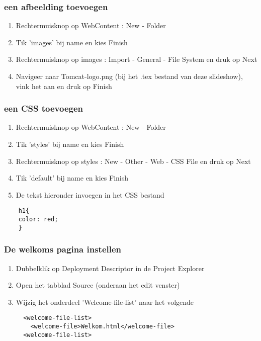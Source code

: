\documentclass{beamer}
\begin{document}
\begin{frame}

\frametitle{een afbeelding toevoegen}

\begin{enumerate}
  \item Rechtermuisknop op WebContent : New - Folder
  \item Tik 'images' bij name en kies Finish
  \item Rechtermuisknop op images : Import - General - File System en druk op Next
  \item Navigeer naar Tomcat-logo.png (bij het .tex bestand van deze slideshow), vink het aan en druk op Finish
\end{enumerate}

\end{frame}


\begin{frame}[fragile]

\frametitle{een CSS toevoegen}

\begin{enumerate}
  \item Rechtermuisknop op WebContent : New - Folder
  \item Tik 'styles' bij name en kies Finish
  \item Rechtermuisknop op styles : New - Other - Web - CSS File en druk op Next
  \item Tik 'default' bij name en kies Finish
  \item De tekst hieronder invoegen in het CSS bestand
\end{enumerate}

\begin{verbatim}
    h1{ 
    color: red;
    }
\end{verbatim}

\end{frame}


\begin{frame}[fragile]

\frametitle{De welkoms pagina instellen}

\begin{enumerate}
  \item Dubbelklik op Deployment Descriptor in de Project Explorer
  \item Open het tabblad Source (onderaan het edit venster)
  \item Wijzig het onderdeel 'Welcome-file-list' naar het volgende
  \begin{verbatim}
  <welcome-file-list>
    <welcome-file>Welkom.html</welcome-file>
  <welcome-file-list>
  \end{verbatim}
\end{enumerate}

\end{frame}
\end{document}
